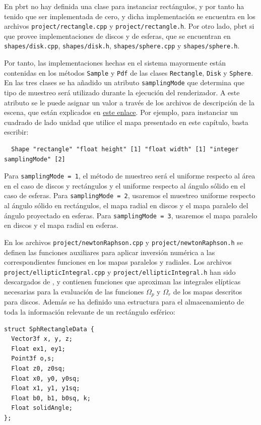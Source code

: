 En pbrt no hay definida una clase para instanciar rectángulos, y por tanto ha tenido que ser implementada de cero, y dicha implementación se encuentra en los archivos \lstinline{project/rectangle.cpp} y \lstinline{project/rectangle.h}. Por otro lado, pbrt si que provee implementaciones de discos y de esferas, que se encuentran en \lstinline{shapes/disk.cpp}, \lstinline{shapes/disk.h}, \lstinline{shapes/sphere.cpp} y \lstinline{shapes/sphere.h}.

Por tanto, las implementaciones hechas en el sistema mayormente están contenidas en los métodos \lstinline{Sample} y \lstinline{Pdf} de las clases \lstinline{Rectangle}, \lstinline{Disk} y \lstinline{Sphere}. En las tres clases se ha añadido un atributo \lstinline{samplingMode} que determina que tipo de muestreo será utilizado durante la ejecución del renderizador. A este atributo se le puede asignar un valor a través de los archivos de descripción de la escena, que están explicados en \href{https://pbrt.org/fileformat-v3}{este enlace}. Por ejemplo, para instanciar un cuadrado de lado unidad que utilice el mapa presentado en este capítulo, basta escribir:
\begin{lstlisting}
  Shape "rectangle" "float height" [1] "float width" [1] "integer samplingMode" [2] 
\end{lstlisting}

Para \lstinline{samplingMode = 1}, el método de muestreo será el uniforme respecto al área en el caso de discos y rectángulos y el uniforme respecto al ángulo sólido en el caso de esferas. Para \lstinline{samplingMode = 2}, usaremos el muestreo uniforme respecto al ángulo sólido en rectángulos, el mapa radial en discos y el mapa paralelo del ángulo proyectado en esferas. Para \lstinline{samplingMode = 3}, usaremos el mapa paralelo en discos y el mapa radial en esferas.

En los archivos \lstinline{project/newtonRaphson.cpp} y \lstinline{project/newtonRaphson.h} se definen las funciones auxiliares para aplicar inversión numérica a las correspondientes funciones en los mapas paralelos y radiales. Los archivos \lstinline{project/ellipticIntegral.cpp} y \lstinline{project/ellipticIntegral.h} han sido descargados de \cite{codigoIntegralEliptica}, y contienen funciones que aproximan las integrales elípticas necesarias para la evaluación de las funciones $\Omega_p$ y $\Omega_r$ de los mapas descritos para discos. Además se ha definido una estructura para el almacenamiento de toda la información relevante de un rectángulo esférico:
\newpage
\begin{lstlisting}[style = CodigoC++]
struct SphRectangleData {
  Vector3f x, y, z;
  Float ex1, ey1;
  Point3f o,s;
  Float z0, z0sq;
  Float x0, y0, y0sq;
  Float x1, y1, y1sq;
  Float b0, b1, b0sq, k;
  Float solidAngle;
};
\end{lstlisting}


